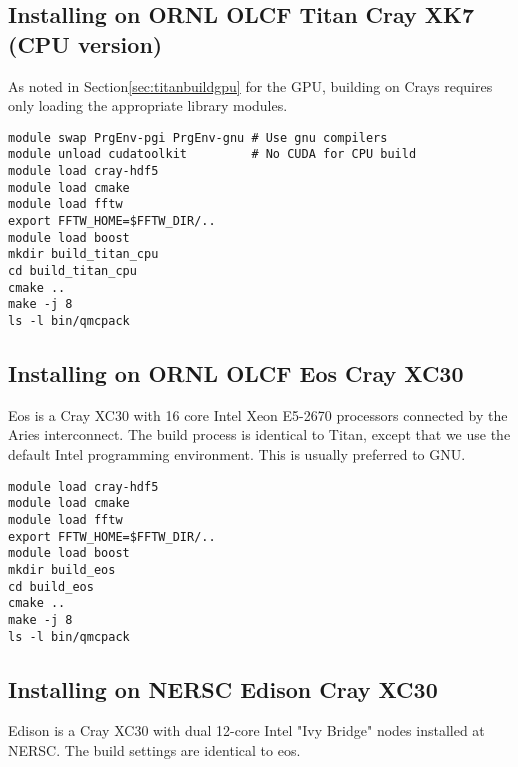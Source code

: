 \subsection{Installing on ORNL OLCF Titan Cray XK7 (CPU version)}
As noted in Section\ref{sec:titanbuildgpu} for the GPU, building on
Crays requires only loading the appropriate library modules.

\begin{verbatim}
module swap PrgEnv-pgi PrgEnv-gnu # Use gnu compilers
module unload cudatoolkit         # No CUDA for CPU build
module load cray-hdf5
module load cmake
module load fftw
export FFTW_HOME=$FFTW_DIR/..
module load boost
mkdir build_titan_cpu
cd build_titan_cpu
cmake ..
make -j 8  
ls -l bin/qmcpack 
\end{verbatim}

\subsection{Installing on ORNL OLCF Eos Cray XC30}
Eos is a Cray XC30 with 16 core Intel Xeon E5-2670 processors connected
by the Aries interconnect. The build process is identical to Titan,
except that we use the default Intel programming environment. This is
usually preferred to GNU.
\begin{verbatim}
module load cray-hdf5
module load cmake
module load fftw
export FFTW_HOME=$FFTW_DIR/..
module load boost
mkdir build_eos
cd build_eos
cmake ..
make -j 8 
ls -l bin/qmcpack 
\end{verbatim}

\subsection{Installing on NERSC Edison Cray XC30}

Edison is a Cray XC30 with dual 12-core Intel "Ivy Bridge" nodes 
installed at NERSC. The build settings are identical to eos. 

